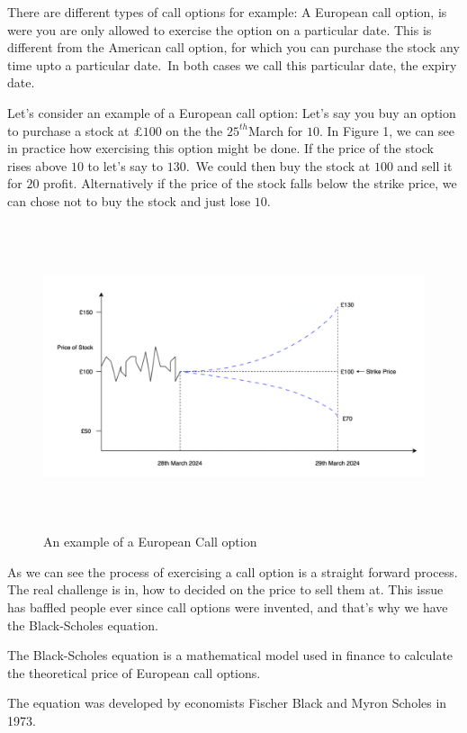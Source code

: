 \documentclass[11pt]{article}
\begin{document}
There are different types of call options for example: A European call option, is were you are only allowed to exercise the option on a particular date. This is different from the American call option, for which you can purchase the stock any time upto a particular date.\ In both cases we call this particular date, the expiry date. 

Let's consider an example of a European call option: Let's say you buy an option to purchase a stock at \textsterling $£100$ on the the $25^{th}$March for \textsterling $10$. In Figure 1, we can see in practice how exercising this option might be done.
If the price of the stock rises above \textsterling$10$ to let's say to \textsterling$130$.\ We could then buy the stock at \textsterling$100$ and sell it for \textsterling$20$ profit. Alternatively if the price of the stock falls below the strike price, we can chose not to buy the stock and just lose \textsterling$10$.
\begin{figure}[H]
\includegraphics[width=1\linewidth, height=9cm]{Call-option.png}
\caption{An example of a European Call option}
\end{figure}
As we can see the process of exercising a call option is a straight forward process. The real challenge is in, how to decided on the price to sell them at. This issue has baffled people ever since call options were invented, and that's why we have the Black-Scholes equation.

The Black-Scholes equation is a mathematical model used in finance to calculate the theoretical price of European call options.

The equation was developed by economists Fischer Black and Myron Scholes in 1973.
\end{document}
